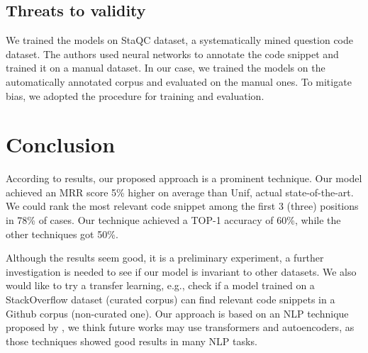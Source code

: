 \documentclass[sigconf]{acmart}
\begin{document}
\subsection{Threats to validity}

We trained the models on StaQC dataset, a systematically mined question code dataset. The authors used neural networks to annotate the code snippet and trained it on a manual dataset. In our case, we trained the models on the automatically annotated corpus and evaluated on the manual ones. To mitigate bias, we adopted the \cite{iyer-etal-2016-summarizing} procedure for training and evaluation.

\section{Conclusion}

According to results, our proposed approach is a prominent technique. Our model achieved an MRR score 5\% higher on average than Unif, actual state-of-the-art. We could rank the most relevant code snippet among the first 3 (three) positions in 78\% of cases. Our technique achieved a TOP-1 accuracy of 60\%, while the other techniques got 50\%. 

Although the results seem good, it is a preliminary experiment, a further investigation is needed to see if our model is invariant to other datasets. We also would like to try a transfer learning, e.g., check if a model trained on a StackOverflow dataset (curated corpus) can find relevant code snippets in a Github corpus (non-curated one). Our approach is based on an NLP technique proposed by \cite{feng-2015}, we think future works may use transformers and autoencoders, as those techniques showed good results in many NLP tasks. 




\end{document}
